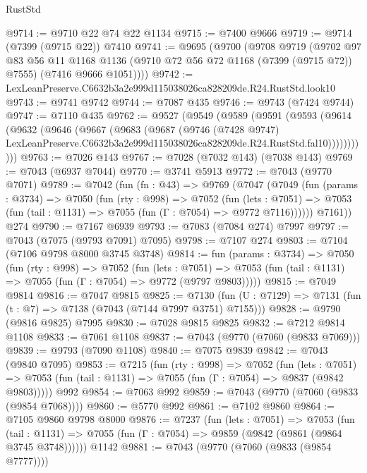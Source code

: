 \begin{lexlean}{RustStd}
\begin{coremodule}
@9714 := @9710 @22 @74 @22 @1134
@9715 := @7400 @9666
@9719 := @9714 (@7399 (@9715 @22)) @7410
@9741 := @9695
    (@9700
      (@9708
        @9719
        (@9702
          @97
          @83
          @56
          @11
          @1168
          @1136
          (@9710 @72 @56 @72 @1168 (@7399 (@9715 @72)) @7555)
          (@7416 @9666 @1051))))
@9742 := LexLeanPreserve.C6632b3a2e999d115038026ca828209de.R24.RustStd.look10
@9743 := @9741 @9742
@9744 := @7087 @435
@9746 := @9743 (@7424 @9744)
@9747 := @7110 @435
@9762 := @9527
    (@9549
      (@9589
        (@9591
          (@9593
            (@9614
              (@9632
                (@9646
                  (@9667
                    (@9683
                      (@9687
                        (@9746
                          (@7428 @9747)
                          LexLeanPreserve.C6632b3a2e999d115038026ca828209de.R24.RustStd.fal10)))))))))))
@9763 := @7026 @143
@9767 := @7028 (@7032 @143) (@7038 @143)
@9769 := @7043 (@6937 @7044)
@9770 := @3741 @5913
@9772 := @7043 (@9770 @7071)
@9789 := @7042
    (fun (fn : @43) =>
    @9769
      (@7047
        (@7049
          (fun (params : @3734) =>
          @7050
            (fun (rty : @998) =>
            @7052
              (fun (lets : @7051) =>
              @7053 (fun (tail : @1131) => @7055 (fun (Γ : @7054) => @9772 @7116))))))
        @7161))
    @274
@9790 := @7167 @6939
@9793 := @7083 (@7084 @274) @7997
@9797 := @7043 (@7075 (@9793 @7091) @7095)
@9798 := @7107 @274
@9803 := @7104 (@7106 @9798 @8000 @3745 @3748)
@9814 := fun (params : @3734) =>
  @7050
    (fun (rty : @998) =>
    @7052
      (fun (lets : @7051) =>
      @7053 (fun (tail : @1131) => @7055 (fun (Γ : @7054) => @9772 (@9797 @9803)))))
@9815 := @7049 @9814
@9816 := @7047 @9815
@9825 := @7130 (fun (U : @7129) => @7131 (fun (t : @7) => @7138 (@7043 (@7144 @7997 @3751) @7155)))
@9828 := @9790 (@9816 @9825) @7995
@9830 := @7028 @9815 @9825
@9832 := @7212 @9814 @1108
@9833 := @7061 @1108
@9837 := @7043 (@9770 (@7060 (@9833 @7069)))
@9839 := @9793 (@7090 @1108)
@9840 := @7075 @9839
@9842 := @7043 (@9840 @7095)
@9853 := @7215
    (fun (rty : @998) =>
    @7052
      (fun (lets : @7051) =>
      @7053 (fun (tail : @1131) => @7055 (fun (Γ : @7054) => @9837 (@9842 @9803)))))
    @992
@9854 := @7063 @992
@9859 := @7043 (@9770 (@7060 (@9833 (@9854 @7068))))
@9860 := @5770 @992
@9861 := @7102 @9860
@9864 := @7105 @9860 @9798 @8000
@9876 := @7237
    (fun (lets : @7051) =>
    @7053
      (fun (tail : @1131) => @7055 (fun (Γ : @7054) => @9859 (@9842 (@9861 (@9864 @3745 @3748))))))
    @1142
@9881 := @7043 (@9770 (@7060 (@9833 (@9854 @7777))))

\end{coremodule}
\end{lexlean}
